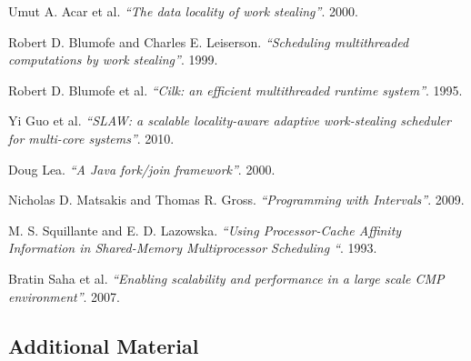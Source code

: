 \begin{frame}
  \begin{thebibliography}{10}
    \beamertemplatearticlebibitems

   Umut A. Acar et al. {\em``The data locality
      of work stealing''}. 2000.

   Robert D. Blumofe and Charles
    E. Leiserson. {\em``Scheduling multithreaded computations by work
      stealing''}. 1999.

   Robert D. Blumofe et al. {\em``Cilk: an efficient
      multithreaded runtime system''}. 1995.

   Yi Guo et al. {\em``SLAW: a scalable locality-aware
      adaptive work-stealing scheduler for multi-core
      systems''}. 2010.

   Doug Lea. {\em``A Java fork/join
      framework''}. 2000.

   Nicholas D. Matsakis and Thomas
    R. Gross. {\em``Programming with Intervals''}. 2009.

   M. S. Squillante and
    E. D. Lazowska. {\em``Using Processor-Cache Affinity Information
      in Shared-Memory Multiprocessor Scheduling ``}. 1993.

   Bratin Saha et al. {\em``Enabling scalability and
      performance in a large scale CMP environment''}. 2007.

  \end{thebibliography}
\end{frame}

\note{}

\subsection{Additional Material}

